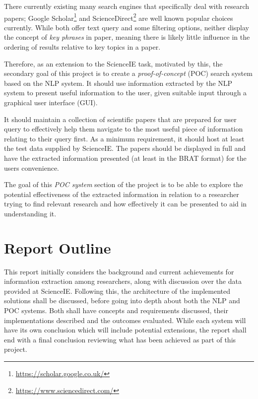 There currently existing many search engines that specifically deal with research papers; Google Scholar\footnote{\href{https://scholar.google.co.uk/}{https://scholar.google.co.uk/}} and ScienceDirect\footnote{\href{https://www.sciencedirect.com/}{https://www.sciencedirect.com/}} are well known popular choices currently. While both offer text query and some filtering options, neither display the concept of \textit{key phrases} in paper, meaning there is likely little influence in the ordering of results relative to key topics in a paper.

Therefore, as an extension to the ScienceIE task, motivated by this, the secondary goal of this project is to create a \textit{proof-of-concept} (POC) search system based on the NLP system. It should use information extracted by the NLP system to present useful information to the user, given suitable input through a graphical user interface (GUI). 

It should maintain a collection of scientific papers that are prepared for user query to effectively help them navigate to the most useful piece of information relating to their query first. As a minimum requirement, it should host at least the test data supplied by ScienceIE. The papers should be displayed in full and have the extracted information presented (at least in the BRAT format) for the users convenience.

The goal of this \textit{POC system} section of the project is to be able to explore the potential effectiveness of the extracted information in relation to a researcher trying to find relevant research and how effectively it can be presented to aid in understanding it. 

\section{Report Outline}

This report initially considers the background and current achievements for information extraction among researchers, along with discussion over the data provided at ScienceIE. Following this, the architecture of the implemented solutions shall be discussed, before going into depth about both the NLP and POC systems. Both shall have concepts and requirements discussed, their implementations described and the outcomes evaluated. While each system will have its own conclusion which will include potential extensions, the report shall end with a final conclusion reviewing what has been achieved as part of this project.
